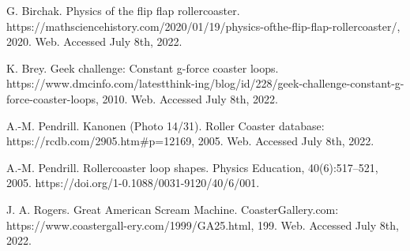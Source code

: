 \documentclass{article}
\begin{document}
\begin{thebibliography}{99}  

 G. Birchak. Physics of the flip flap rollercoaster. https://mathsciencehistory.com/2020/01/19/physics-ofthe-flip-flap-rollercoaster/, 2020. Web. Accessed July 8th, 2022.

 K. Brey. Geek challenge: Constant g-force coaster loops. https://www.dmcinfo.com/latestthink-ing/blog/id/228/geek-challenge-constant-g-force-coaster-loops, 2010. Web. Accessed July 8th, 2022.

 A.-M. Pendrill. Kanonen (Photo 14/31). Roller Coaster database: https://rcdb.com/2905.htm#p=12169,
2005. Web. Accessed July 8th, 2022.

 A.-M. Pendrill. Rollercoaster loop shapes. Physics Education, 40(6):517–521, 2005.
https://doi.org/1-0.1088/0031-9120/40/6/001.

 J. A. Rogers. Great American Scream Machine. CoasterGallery.com:
https://www.coastergall-ery.com/1999/GA25.html, 199. Web. Accessed July 8th, 2022.
\end{thebibliography}
\end{document}
